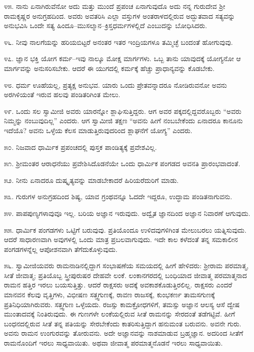 ೪೫. ನಾನು ಏನಾಗಿರುವೆನೋ ಅದು ಮತ್ತು ಮುಂದೆ ಪ್ರಪಂಚ ಏನಾಗುವುದೊ ಅದು ನನ್ನ ಗುರುದೇವ ಶ‍್ರೀ ರಾಮಕೃಷ್ಣರ ಅನುಗ್ರಹದಿಂದ. ಅವರು ಅವತರಿಸಿ ಎಲ್ಲಾ ವಸ್ತುಗಳ ಅಂತರಾಳದಲ್ಲಿರುವ ಅದ್ಭುತವಾದ ಸತ್ಯವನ್ನು ಅನುಭವಿಸಿ ಒಂದೇ ಸತ್ಯ ಹಿಂದೂ–ಮುಸಲ್ಮಾನ–ಕ್ರಿಸ್ತಧರ್ಮಗಳಲ್ಲಿದೆ ಎಂಬುದನ್ನು ಬೋಧಿಸಿದರು.

೪೬. ನೀವು ನಾಲಗೆಯನ್ನು ಹರಿಯಬಿಟ್ಟರೆ ಅನಂತರ ಇತರ ಇಂದ್ರಿಯಗಳೂ ತಮ್ಮಿಚ್ಛೆ ಬಂದಂತೆ ಹೋಗುವುವು.

೪೭. ಜ್ಞಾನ ಭಕ್ತಿ ಯೋಗ ಕರ್ಮ–ಇವು ನಾಲ್ಕೂ ಮೋಕ್ಷ ಮಾರ್ಗಗಳು. ಒಬ್ಬ ತಾನು ಯಾವುದಕ್ಕೆ ಯೋಗ್ಯನೋ ಆ ಮಾರ್ಗವನ್ನು ಅನುಸರಿಸಬೇಕು. ಆದರೆ ಈ ಯುಗದಲ್ಲಿ ಕರ್ಮಕ್ಕೆ ಹೆಚ್ಚು ಪ್ರಾಧಾನ್ಯವನ್ನು ಕೊಡಬೇಕು.

೪೮. ಧರ್ಮ ಊಹೆಯಲ್ಲ, ಪ್ರತ್ಯಕ್ಷ ಅನುಭವ. ಯಾರು ಒಂದು ಪ್ರೇತವನ್ನಾದರೂ ನೋಡಿರುವನೋ ಅವನು ಅರಗಿಳಿಯಂತೆ ಇರುವ ಹಲವು ಪಂಡಿತರಿಗಿಂತ ಮೇಲು.

೪೯. ಒಂದು ಸಲ ಸ್ವಾಮೀಜಿ ಅವರು ಯಾರನ್ನೋ ಶ್ಲಾಘಿಸುತ್ತಿದ್ದರು. ಆಗ ಅವರ ಪಕ್ಕದಲ್ಲಿದ್ದವರೊಬ್ಬರು “ಅವರು ನಿಮ್ಮನ್ನು ನಂಬುವುದಿಲ್ಲ” ಎಂದರು. ಆಗ ಸ್ವಾಮೀಜಿ ತಕ್ಷಣ “ಅವನು ಹೀಗೆ ನಂಬಬೇಕೆಂದು ಏನಾದರೂ ಕಾನೂನು ಇದೆಯೊ? ಅವನು ಒಳ್ಳೆಯ ಕೆಲಸ ಮಾಡುತ್ತಿರುವುದರಿಂದ ಶ್ಲಾಘನೆಗೆ ಯೋಗ್ಯ” ಎಂದರು.

೫೦. ನಿಜವಾದ ಧಾರ್ಮಿಕ ಪ್ರಪಂಚದಲ್ಲಿ ಪುಸ್ತಕ ಪಾಂಡಿತ್ಯಕ್ಕೆ ಪ್ರವೇಶವಿಲ್ಲ.

೫೧. ಶ‍್ರೀಮಂತರ ಆರಾಧನೆಯು ಪ್ರವೇಶಿಸಿದೊಡನೆಯೇ ಒಂದು ಧಾರ್ಮಿಕ ಪಂಗಡದ ಅವನತಿ ಪ್ರಾರಂಭವಾದಂತೆ.

೫೨. ನೀನು ಏನಾದರೂ ದುಷ್ಕೃತ್ಯವನ್ನು ಮಾಡಬೇಕಾದರೆ ಹಿರಿಯರೆದುರಿಗೆ ಮಾಡು.

೫೩. ಗುರುಗಳ ಅನುಗ್ರಹದಿಂದ ಶಿಷ್ಯ, ಯಾವ ಗ್ರಂಥವನ್ನೂ ಓದದೇ ಇದ್ದರೂ, ಉದ್ಧಾಮ ಪಂಡಿತನಾಗುವನು.

೫೪. ಪಾಪಪುಣ್ಯಗಳಾವುವೂ ಇಲ್ಲ. ಬರಿಯ ಅಜ್ಞಾನ ಇರುವುದು. ಅದ್ವೈತ ಜ್ಞಾನದಿಂದ ಅಜ್ಞಾನ ನಿವಾರಣೆ ಆಗುವುದು.

೫೫. ಧಾರ್ಮಿಕ ಪಂಗಡಗಳು ಒಟ್ಟಿಗೆ ಬರುವುವು. ಪ್ರತಿಯೊಂದೂ ಉಳಿದವುಗಳಿಗಿಂತ ಮೇಲುಬರಲು ಯತ್ನಿಸುವುದು. ಆದರೆ ಸಾಧಾರಣವಾಗಿ ಅವುಗಳಲ್ಲಿ ಒಂದು ಮಾತ್ರ ಪ್ರಬಲವಾಗುವುದು. ಇದೇ ಕಾಲ ಕಳೆದಂತೆ ತನ್ನ ಸಮಕಾಲೀನ ಪಂಗಡಗಳನ್ನೆಲ್ಲ ಆಪೋಶನವಾಗಿ ತೆಗೆದುಕೊಳ್ಳುವುದು.

೫೬. ಸ್ವಾಮೀಜಿಯವರು ರಾಮನಾಡಿನಲ್ಲಿದ್ದಾಗ ಸಂಭಾಷಣೆಯ ಸಮಯದಲ್ಲಿ ಹೀಗೆ ಹೇಳಿದರು: ಶ‍್ರೀರಾಮ ಪರಮಾತ್ಮ, ಸೀತೆ ಜೀವಾತ್ಮ; ಪ್ರತಿಯೊಬ್ಬ ಸ್ತ್ರೀಪುರುಷರ ದೇಹವೇ ಲಂಕೆ. ಲಂಕಾನಗರದಲ್ಲಿ ಬಂಧಿಯಾದ ಜೀವಾತ್ಮ ಪರಮಾತ್ಮನಾದ ರಾಮನ ಹತ್ತಿರ ಇರಲು ಬಯಸುತ್ತಿತ್ತು. ಆದರೆ ರಾಕ್ಷಸರು ಅದಕ್ಕೆ ಅವಕಾಶಕೊಡುತ್ತಿರಲಿಲ್ಲ. ರಾಕ್ಷಸರು ಎಂದರೆ ಮಾನವನ ಕೆಲವು ವೃತ್ತಿಗಳು, ವಿಭೀಷಣ ಸತ್ತ್ವಗುಣಕ್ಕೆ, ರಾವಣ ರಾಜಸಕ್ಕೆ, ಕುಂಭಕರ್ಣ ತಾಮಸಗುಣಕ್ಕೆ ಪ್ರತಿನಿಧಿಯಾಗಿರುವರು. ಸತ್ತ್ವಗುಣ ಒಳ್ಳೆಯದು. ರಜಸ್ಸು ಕಾಮಕ್ರೋಧಗಳಿಗೆ, ತಮಸ್ಸು ಅಜ್ಞಾನ ಆಲಸ್ಯ ಆಸೆ ದ್ವೇಷ ಮುಂತಾದವಕ್ಕೆ ನಿಂತಿರುವುದು. ಈ ಗುಣಗಳೇ ಲಂಕೆಯಲ್ಲಿರುವ ಸೀತೆ ರಾಮನನ್ನು ಸೇರದಂತೆ ತಡೆಗಟ್ಟಿವೆ. ಹೀಗೆ ಬಂಧನದಲ್ಲಿರುವ ಸೀತೆ ತನ್ನ ಪತಿಯನ್ನು ಸೇರಬೇಕೆಂದು ಕಾತರಿಸುತ್ತಿದ್ದಾಗ ಹನುಮಂತ ಬರುವನು. ಅವನೇ ಗುರು. ಅವನು ರಾಮನ ಉಂಗುರವನ್ನು ತೋರುವನು. ಅದೇ ಅಜ್ಞಾನವನ್ನು ನಾಶಮಾಡುವ ಬ್ರಹ್ಮಜ್ಞಾನ. ಅದರಿಂದ ಸೀತೆಗೆ ರಾಮನೊಂದಿಗೆ ಇರಲು ಸಾಧ್ಯವಾಯಿತು. ಅಥವಾ ಜೀವಾತ್ಮ ಪರಮಾತ್ಮನೊಡನೆ ಇರಲು ಸಾಧ್ಯವಾಯಿತು.

